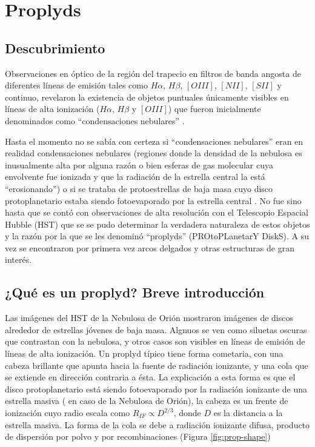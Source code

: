 \section{Proplyds}
\subsection{Descubrimiento}
Observaciones en óptico de la región del trapecio en filtros de banda
angosta de diferentes líneas de emisión tales como $H\alpha$, $H\beta$,
$[OIII]$, $[NII]$, $[SII]$ y continuo, revelaron la existencia de
objetos puntuales únicamente visibles en líneas de alta ionización
($H\alpha$, $H\beta$ y $[OIII]$) que fueron inicialmente denominados como
``condensaciones nebulares'' \citep{Laques:1979}. 

Hasta el momento no se sabía con certeza si ``condensaciones nebulares''
eran en realidad condensaciones nebulares (regiones donde la densidad de
la nebulosa es inusualmente alta por alguna razón o bien esferas de gas
molecular cuya envolvente fue ionizada y que la radiación de la estrella
central la está ``erosionando'') o si se trataba de protoestrellas
de baja masa cuyo disco protoplanetario estaba siendo fotoevaporado por
la estrella central \citep{churchwell:1987}. No fue sino hasta que se contó
con observaciones de alta resolución con el Telescopio Espacial Hubble (HST)
que se se pudo determinar la verdadera naturaleza de estos objetos
\citep{ODell:1993} y la razón por la que se les denominó ``proplyds''
(PROtoPLanetarY DiskS). A su vez se encontraron por primera vez arcos
delgados y otras estructuras de gran interés.

\subsection{¿Qué es un proplyd? Breve introducción \citep{Johnstone:1998}}

Las imágenes del HST de la Nebulosa de Orión mostraron imágenes de discos
alrededor de estrellas jóvenes de baja masa. Algnuos se ven como siluetas
oscuras que contrastan con la nebulosa, y otros casos son visibles en
líneas de emisión de líneas de alta ionización. Un proplyd típico tiene forma
cometaria, con una cabeza brillante que apunta hacia la fuente de radiación
ionizante, y una cola que se extiende en dirección contraria a ésta. La explicación
a esta forma es que el disco protoplanetario está siendo fotoevaporado por la
radiación ionizante de una estrella masiva (\thC{} en caso de la Nebulosa
de Orión), la cabeza es un frente de ionización cuyo radio escala como
$R_{IF} \propto D^{2/3}$, donde $D$ es la distancia a la estrella masiva. La forma
de la cola se debe a radiación ionizante difusa, producto de dispersión por polvo
y por recombinaciones (Figura \ref{fig:prop-shape})

